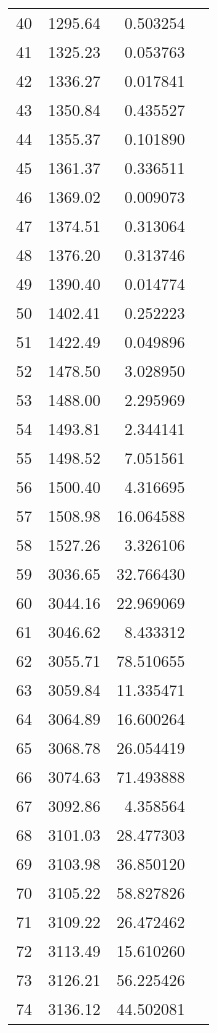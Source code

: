 \begin{tabular}{r|rr|l}
40 & 1295.64  &  0.503254  & \\
41 & 1325.23  &  0.053763  & \\
42 & 1336.27  &  0.017841  & \\
43 & 1350.84  &  0.435527  & \\
44 & 1355.37  &  0.101890  & \\
45 & 1361.37  &  0.336511  & \\
46 & 1369.02  &  0.009073  & \\
47 & 1374.51  &  0.313064  & \\
48 & 1376.20  &  0.313746  & \\
49 & 1390.40  &  0.014774  & \\
50 & 1402.41  &  0.252223  & \\
51 & 1422.49  &  0.049896  & \\
52 & 1478.50  &  3.028950  & \\
53 & 1488.00  &  2.295969  & \\
54 & 1493.81  &  2.344141  & \\
55 & 1498.52  &  7.051561  & \\
56 & 1500.40  &  4.316695  & \\
57 & 1508.98  & 16.064588  & \\
58 & 1527.26  &  3.326106  & \\
59 & 3036.65  & 32.766430  & \\
60 & 3044.16  & 22.969069  & \\
61 & 3046.62  &  8.433312  & \\
62 & 3055.71  & 78.510655  & \\
63 & 3059.84  & 11.335471  & \\
64 & 3064.89  & 16.600264  & \\
65 & 3068.78  & 26.054419  & \\
66 & 3074.63  & 71.493888  & \\
67 & 3092.86  &  4.358564  & \\
68 & 3101.03  & 28.477303  & \\
69 & 3103.98  & 36.850120  & \\
70 & 3105.22  & 58.827826  & \\
71 & 3109.22  & 26.472462  & \\
72 & 3113.49  & 15.610260  & \\
73 & 3126.21  & 56.225426  & \\
74 & 3136.12  & 44.502081  & \\
  \bottomrule
\end{tabular}
\normalsize

